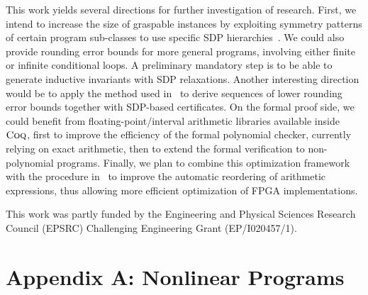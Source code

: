 \documentclass[preprint,fleqn,nocopyrightspace]{sigplanconf}
\newcommand{\coq}{\text{\sc Coq}}
\theoremstyle{plain}
\begin{document}
This work yields several directions for further investigation of research. 
First, we intend to increase the size of graspable instances by exploiting symmetry patterns of certain program sub-classes to use specific SDP hierarchies~\cite{Riener2013SymmetricSDP}. We could also provide rounding error bounds for more general programs, involving either finite or infinite conditional loops. A preliminary mandatory step is to be able to generate inductive invariants with SDP relaxations. Another interesting direction would be to apply the method used in~\cite{Lasserre11} to derive sequences of lower rounding error bounds together with SDP-based certificates.
On the formal proof side, we could benefit from floating-point/interval arithmetic libraries available inside $\coq$, first to improve the efficiency of the formal polynomial checker, currently relying on exact arithmetic, then to extend the formal verification to non-polynomial programs.
%
Finally, we plan to combine this optimization framework with the procedure in~\cite{Gao15FPGA} to improve the automatic reordering of arithmetic expressions, thus allowing more efficient optimization of FPGA implementations.

\acks
This work was partly funded by the Engineering and Physical Sciences Research Council (EPSRC) Challenging Engineering Grant (EP/I020457/1).



\fi

\appendix
\section*{Appendix A: Nonlinear Programs}
\label{sec:appa}
%

\end{document}
